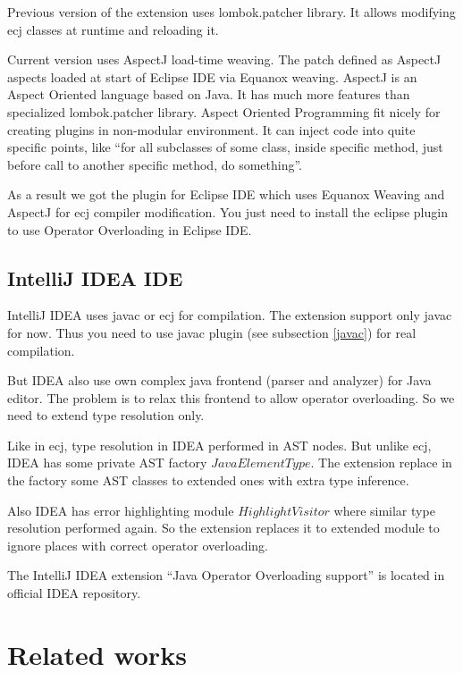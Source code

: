 \documentclass{aircc}
\begin{document}
Previous version of the extension\cite{lombok-oo} uses lombok.patcher\cite{lombok.patcher} library.
It allows modifying ecj classes at runtime and reloading it.

Current version uses AspectJ load-time weaving\cite{AJLTW}. 
The patch defined as AspectJ aspects loaded at start of Eclipse IDE via Equanox weaving\cite{EquanoxW}.
AspectJ is an Aspect Oriented language based on Java.
It has much more features than specialized lombok.patcher library.
Aspect Oriented Programming fit nicely for creating plugins in non-modular environment.
It can inject code into quite specific points, like ``for all subclasses of some class, inside specific method, just before call to another specific method, do something''.

As a result we got the plugin for Eclipse IDE which uses Equanox Weaving and AspectJ for ecj compiler modification.
You just need to install the eclipse plugin to use Operator Overloading in Eclipse IDE.

\subsection{IntelliJ IDEA IDE \label{idea}}

IntelliJ IDEA uses javac or ecj for compilation. The extension support only javac for now.
Thus you need to use javac plugin (see subsection \ref{javac}) for real compilation.

But IDEA also use own complex java frontend (parser and analyzer) for Java editor.
The problem is to relax this frontend to allow operator overloading. So we need to extend type resolution only.

Like in ecj, type resolution in IDEA performed in AST nodes. 
But unlike ecj, IDEA has some private AST factory $JavaElementType$.
The extension replace in the factory some AST classes to extended ones with extra type inference.

Also IDEA has error highlighting module $HighlightVisitor$ where similar type resolution performed again.
So the extension replaces it to extended module to ignore places with correct operator overloading.

The IntelliJ IDEA extension ``Java Operator Overloading support'' is located in official IDEA repository.



\section{Related works}
\end{document}
